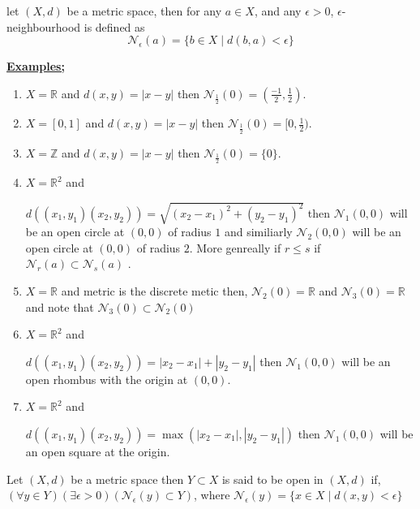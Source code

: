 \documentclass[12pt,a4paper]{article}
\begin{document}
let \(\left( X,d \right) \) be a metric space, then for any \(a \in X\), and any \(\epsilon > 0\), \(\epsilon\)-neighbourhood is defined as
\begin{equation*}
    \mathcal{N}_{\epsilon}(a)=\{ b \in X \mid d(b,a) < \epsilon\}
\end{equation*}      

\underline{\textbf{Examples;}}
\begin{enumerate}
    \item \(X=\mathbb{R}\) and \(d(x,y)= |x-y|\)
    then \(\mathcal{N}_{\frac{1}{2}}(0) = \left( \frac{-1}{2}, \frac{1}{2} \right) \).
    \item \(X=[0,1]\) and \(d(x,y)=|x-y|\) 
    then \(\mathcal{N}_{\frac{1}{2}}(0) = [ 0, \frac{1}{2}) \).        
    \item \(X=\mathbb{Z}\) and \(d(x,y)=|x-y|\) 
    then \(\mathcal{N}_{\frac{1}{2}}(0) = \{0\} \).     
    \item \(X=\mathbb{R}^2\) and 
    
    \(d((x_{1},y_{1})(x_{2},y_{2}))= \sqrt{{(x_{2}-x_{1})}^2 +{(y_{2}-y_{1})}^2}\) 
    then \(\mathcal{N}_{1}(0,0)\) will be an open circle at \((0,0)\) of radius \(1\) and similiarly \(\mathcal{N}_{2}(0,0)\) will be an open circle at \((0,0)\) of radius \(2\). More genreally if \(r \leq s\) if \(\mathcal{N}_{r}(a) \subset \mathcal{N}_{s}(a)\) .
    \item \(X=\mathbb{R}\) and metric is the discrete metic then,
    \(\mathcal{N}_{2}(0) = \mathbb{R}\) and \(\mathcal{N}_{3}(0)= \mathbb{R}\) and note that \(\mathcal{N}_{3}(0) \subset \mathcal{N}_{2}(0)\)          
    \item \(X=\mathbb{R}^2\) and 
    
    \(d((x_{1},y_{1})(x_{2},y_{2}))= |x_{2}-x_{1}|+ |y_{2}-y_{1}|\) 
    then \(\mathcal{N}_{1}(0,0)\) will be an open rhombus with the origin at \((0,0)\).
    \item \(X=\mathbb{R}^2\) and 
    
    \(d((x_{1},y_{1})(x_{2},y_{2}))= \max{(|x_{2}-x_{1}|,|y_{2}-y_{1}|)}\) 
    then \(\mathcal{N}_{1}(0,0)\) will be an open square at the origin.                   
\end{enumerate}

Let \((X,d)\) be a metric space then \( Y \subset X\) is said to be open in \((X,d)\) if,
\((\forall y \in Y)(\exists \epsilon > 0) (\mathcal{N}_{\epsilon}(y) \subset Y)\),
where \(\mathcal{N}_{\epsilon}(y)= \{ x \in X \mid d(x,y) < \epsilon\}\)
\end{document}
